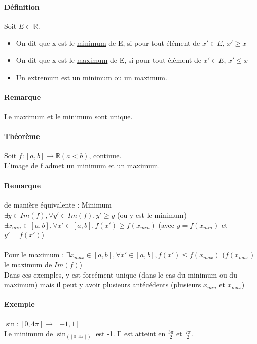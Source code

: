 \paragraph{Définition} Soit $E \subset \mathbb{R}$. ~\\
\begin{itemize}
	\item On dit que x est le \ul{minimum} de E, si pour tout élément de $x' \in E$, $x' \geq x$
	\item On dit que x est le \ul{maximum} de E, si pour tout élément de $x' \in E$, $x' \leq x$
	\item Un \ul{extremum} est un minimum ou un maximum.
\end{itemize}

\paragraph{Remarque} Le maximum et le minimum sont unique.

\paragraph{Théorème} Soit $f:[a, b] \rightarrow \mathbb{R} (a < b)$, continue. ~\\
L'image de f admet un minimum et un maximum.

\paragraph{Remarque} de manière équivalente : Minimum ~\\
$\exists y \in Im(f), \forall y' \in Im(f), y' \geq y$ (ou y est le minimum)
~\\
$\exists x_{min} \in [a, b], \forall x' \in [a, b], f(x') \geq f(x_{min})$ (avec $y = f(x_{min})$ et $y'=f(x')$)
~\\
~\\
Pour le maximum :  $\exists x_{max} \in [a, b], \forall x' \in [a, b], f(x') \leq f(x_{max})$ ($f(x_{max})$ le maximum de $Im(f)$)
~\\

Dans ces exemples, y est forcément unique (dans le cas du minimum ou du maximum) mais il peut y avoir plusieurs antécédents (plusieurs $x_{min}$ et $x_{max}$)

\paragraph{Exemple} $\sin : [0, 4\pi] \rightarrow [-1, 1]$ ~\\
Le minimum de $\sin_([0, 4\pi])$ est -1. Il est atteint en $\frac{3\pi}{2}$ et $\frac{7\pi}{2}$.

